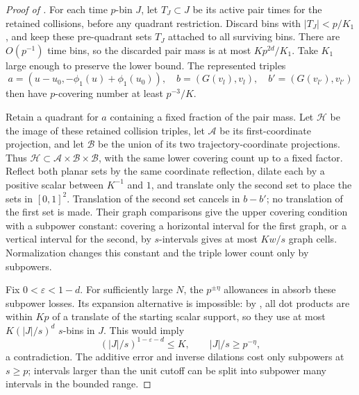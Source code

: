 \begin{proof}[Proof of ]
For each time \(p\)-bin \(J\), let \(T_J\subset J\) be its active
pair times for the retained collisions, before any quadrant restriction.
Discard bins with \(|T_J|<p/K_1\), and keep these pre-quadrant sets
\(T_J\) attached to all surviving bins.
There are \(O(p^{-1})\) time bins, so the discarded pair mass is at most
\(Kp^{2d}/K_1\).  Take \(K_1\) large enough to preserve the lower bound.
The represented triples
\[
 a=(u-u_0,-\phi_1(u)+\phi_1(u_0)),\quad
 b=(G(v_l),v_l),\quad b'=(G(v_{l'}),v_{l'})
\]
then have \(p\)-covering number at least \(p^{-3}/K\).

Retain a quadrant for \(a\) containing a fixed fraction of the pair
mass.  Let \(\mathcal H\) be the image of these retained collision
triples, let \(\mathcal A\) be its first-coordinate projection, and
let \(\mathcal B\) be the union of its two trajectory-coordinate
projections.  Thus
\(\mathcal H\subset\mathcal A\times\mathcal B\times\mathcal B\), with
the same lower covering count up to a fixed factor.
Reflect both planar sets by the same coordinate reflection,
dilate each by a positive scalar between \(K^{-1}\) and \(1\), and
translate only the second set to place the sets in \([0,1]^2\).
Translation of the second set cancels in \(b-b'\); no translation of
the first set is made.
Their graph comparisons give the upper covering condition
 with a subpower constant: covering a
horizontal interval for the first graph, or a vertical interval for
the second, by \(s\)-intervals gives at most \(Kw/s\) graph cells.
Normalization changes this constant and the triple lower count only
by subpowers.

Fix \(0<\varepsilon<1-d\).  For sufficiently large \(N\), the
\(p^{\pm\eta}\) allowances in  absorb these
subpower losses.
Its expansion alternative is impossible: by
, all dot products are within \(Kp\) of a
translate of the starting scalar support, so they use at most
\(K(|J|/s)^d\) \(s\)-bins in \(J\).
This would imply
\[
 (|J|/s)^{1-\varepsilon-d}\le K,
 \qquad |J|/s\ge p^{-\eta},
\]
a contradiction.
The additive error and inverse dilations cost only subpowers at
\(s\ge p\); intervals larger than the unit cutoff can be split into
subpower many intervals in the bounded range.


\end{proof}
